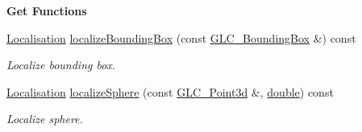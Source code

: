 \begin{Indent}{\bf Get Functions}
\begin{DoxyCompactItemize}
\hyperlink{class_g_l_c___frustum_a37926b89a9da497fc35c6ce746fc00cd}{Localisation} \hyperlink{class_g_l_c___frustum_ac4f2e13b81851a74f12a8caee706c329}{localize\-Bounding\-Box} (const \hyperlink{class_g_l_c___bounding_box}{G\-L\-C\-\_\-\-Bounding\-Box} \&) const 
\begin{DoxyCompactList}\small\item\em Localize bounding box. \end{DoxyCompactList}\item 
\hyperlink{class_g_l_c___frustum_a37926b89a9da497fc35c6ce746fc00cd}{Localisation} \hyperlink{class_g_l_c___frustum_abe1508fb0501f34bd032fa38445a639f}{localize\-Sphere} (const \hyperlink{glc__vector3d_8h_a4e13a9bbc7ab3d34de7e98b41836772c}{G\-L\-C\-\_\-\-Point3d} \&, \hyperlink{_super_l_u_support_8h_a8956b2b9f49bf918deed98379d159ca7}{double}) const 
\begin{DoxyCompactList}\small\item\em Localize sphere. \end{DoxyCompactList}\end{DoxyCompactItemize}
\end{Indent}

